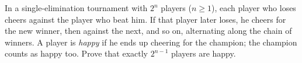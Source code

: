 In a single-elimination tournament with $2^n$ players ($n\ge1$), each player who loses cheers against the player who beat him. If that player later loses, he cheers for the new winner, then against the next, and so on, alternating along the chain of winners. A player is \emph{happy} if he ends up cheering for the champion; the champion counts as happy too. Prove that exactly $2^{n-1}$ players are happy.
